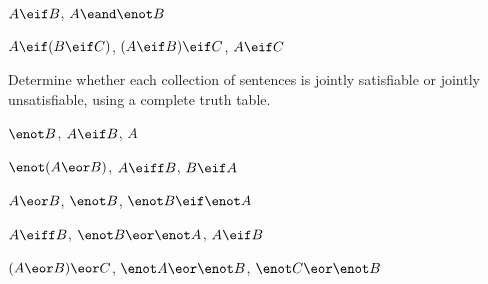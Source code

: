 \begin{compactlist}
% 
%


\item $A \eif B$, $A \eand \enot B$\vspace{.5ex} %

\item $A \eif (B \eif C)$, $(A \eif B) \eif C$, $A \eif C$\vspace{.5ex} %

\end{compactlist}

\noindent\problempart
\label{pr.TT.satisfiable3}
Determine whether each collection of sentences is jointly satisfiable or jointly unsatisfiable, using a complete truth table.
\begin{compactlist}
\item $\enot B$, $A \eif B$, $A$ \vspace{.5ex}%
\item $\enot(A \eor B)$, $A \eiff B$, $B \eif A$\vspace{.5ex} %
\item $A \eor B$, $\enot B$, $\enot B \eif \enot A$\vspace{.5ex} %
\item $A \eiff B$, $\enot B \eor \enot A$, $A \eif B$\vspace{.5ex} %
\item $(A \eor B) \eor C$, $\enot A \eor \enot B$, $\enot C \eor \enot B$\vspace{.5ex} %
\end{compactlist}




